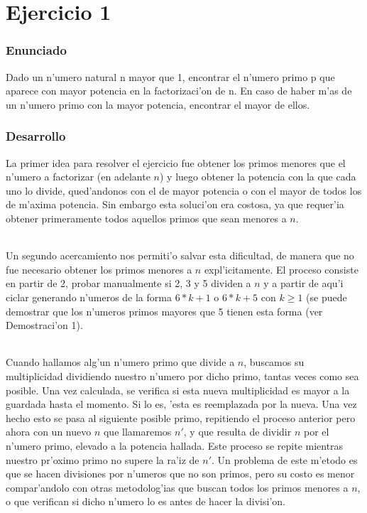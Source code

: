 \part{Ejercicio 1}
\section{Enunciado}
Dado un n'umero natural n mayor que 1, encontrar el n'umero primo p que aparece con mayor potencia en la factorizaci'on de n. En caso de haber m'as de un n'umero primo con  la mayor potencia, encontrar el mayor de ellos.

\section{Desarrollo}
La primer idea para resolver el ejercicio fue obtener los primos menores que el n'umero a factorizar
(en adelante $n$) y luego obtener la potencia con la que cada uno lo divide, qued'andonos con el de mayor
potencia o con el mayor de todos los de m'axima potencia. Sin embargo esta soluci'on era costosa, ya que
requer'ia obtener primeramente todos aquellos primos que sean menores a $n$.
\paragraph{}
Un segundo acercamiento nos permiti'o salvar esta dificultad, de manera que no fue necesario obtener 
los primos menores a $n$ expl'icitamente. El proceso consiste en partir de 2, probar manualmente si 2, 3 y 5 
dividen a $n$ y a partir  de aqu'i ciclar generando n'umeros de la forma $6*k + 1$ o $6*k + 5$ con $k \geq 1$ 
(se puede demostrar que los n'umeros primos mayores que 5 tienen esta forma (ver Demostraci'on 1).
\paragraph{}
Cuando hallamos alg'un n'umero primo que divide a $n$, buscamos su multiplicidad dividiendo nuestro n'umero 
por dicho primo, tantas veces como sea posible. Una vez calculada, se verifica si esta nueva multiplicidad 
es mayor a la guardada hasta el momento. Si lo es, 'esta es reemplazada por la nueva. Una vez hecho esto 
se pasa al siguiente posible primo, repitiendo el proceso anterior pero ahora con un nuevo $n$ que llamaremos 
$n'$, y que resulta de dividir $n$ por el n'umero primo, elevado a la potencia hallada. Este proceso se repite 
mientras nuestro pr'oximo primo no supere la ra'iz de $n'$. Un problema de este m'etodo es que se hacen 
divisiones por n'umeros que no son primos, pero su costo es menor compar'andolo con otras metodolog'ias que
buscan todos los primos menores a $n$, o que verifican si dicho n'umero lo es antes de hacer la divisi'on.
